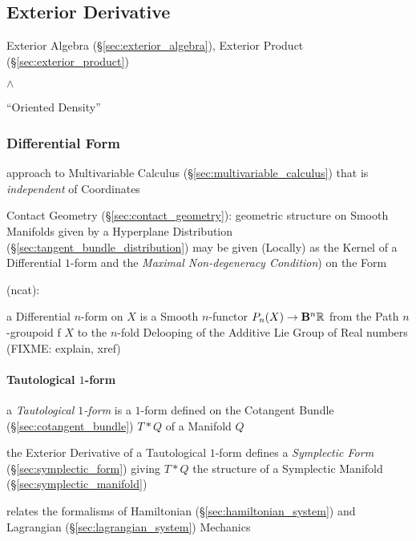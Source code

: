 \subsection{Exterior Derivative}\label{sec:exterior_derivative}

\fist Exterior Algebra (\S\ref{sec:exterior_algebra}), Exterior Product
(\S\ref{sec:exterior_product})

$\wedge$

``Oriented Density'' %



\subsubsection{Differential Form}\label{sec:differential_form}

approach to Multivariable Calculus (\S\ref{sec:multivariable_calculus})
that is \emph{independent} of Coordinates

\fist Contact Geometry (\S\ref{sec:contact_geometry}): geometric structure on
Smooth Manifolds given by a Hyperplane Distribution
(\S\ref{sec:tangent_bundle_distribution}) may be given (Locally) as the Kernel
of a Differential $1$-form and the \emph{Maximal Non-degeneracy Condition}) on
the Form

(ncat):

a Differential $n$-form on $X$ is a Smooth $n$-functor $P_n(X) \rightarrow
\mathbf{B}^n\mathbb{R}$ from the Path $n$-groupoid f $X$ to the $n$-fold Delooping
of the Additive Lie Group of Real numbers (FIXME: explain, xref)



\paragraph{Tautological $1$-form}\label{sec:tautological_1form}\hfill

a \emph{Tautological $1$-form} is a $1$-form defined on the Cotangent Bundle
(\S\ref{sec:cotangent_bundle}) $T * Q$ of a Manifold $Q$

the Exterior Derivative of a Tautological $1$-form defines a \emph{Symplectic
  Form} (\S\ref{sec:symplectic_form}) giving $T * Q$ the structure of a
Symplectic Manifold (\S\ref{sec:symplectic_manifold})

relates the formalisms of Hamiltonian (\S\ref{sec:hamiltonian_system}) and
Lagrangian (\S\ref{sec:lagrangian_system}) Mechanics

